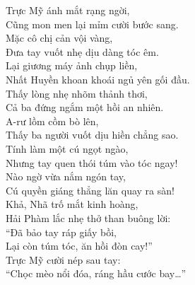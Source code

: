\documentclass[../main.tex]{subfiles}
\begin{document}
\begin{center}
    Trực Mỹ ánh mắt rạng ngời,\\
    Cũng mon men lại mỉm cười bước sang.\\
    Mặc cô chị cản vội vàng,\\
    Đưa tay vuốt nhẹ dịu dàng tóc êm.\\
    Lại giương máy ảnh chụp liền,\\
    Nhất Huyền khoan khoái ngủ yên gối đầu.\\
    Thấy lòng nhẹ nhõm thảnh thơi,\\
    Cả ba đứng ngắm một hồi an nhiên.\\
    A-rư lồm cồm bò lên,\\
    Thấy ba người vuốt dịu hiền chẳng sao.\\
    Tính làm một cú ngọt ngào,\\
    Nhưng tay quen thói túm vào tóc ngay!\\
    Nào ngờ vừa nắm ngón tay,\\
    Cú quyền giáng thẳng lăn quay ra sàn!\\
    Khả, Nhã trố mắt kinh hoàng,\\
    Hải Phàm lắc nhẹ thở than buông lời:\\
    ``Đã bảo tay ráp giấy bồi,\\
    Lại còn túm tóc, ăn hồi đòn cay!''\\
    Trực Mỹ cười nép sau tay:\\
    ``Chọc mèo nổi đóa, ráng hầu cước bay\dots''


\end{center}

\ct
\end{document}

